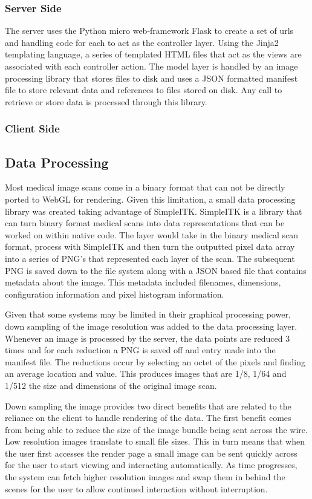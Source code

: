 \documentclass{acm_proc_article-sp}
\begin{document}
\subsubsection{Server Side}
	The server uses the Python micro web-framework Flask to create a set of urls and handling code for each to act as the controller layer.  Using the Jinja2 templating language, a series of templated HTML files that act as the views are associated with each controller action.  The model layer is handled by an image processing library that stores files to disk and uses a JSON formatted manifest file to store relevant data and references to files stored on disk.  Any call to retrieve or store data is processed through this library.

\subsubsection{Client Side}

\subsection{Data Processing}
Most medical image scans come in a binary format that can not be directly ported to WebGL for rendering.  Given this limitation, a small data processing library was created taking advantage of SimpleITK.  SimpleITK is a library that can turn binary format medical scans into data representations that can be worked on within native code.  The layer would take in the binary medical scan format, process with SimpleITK and then turn the outputted pixel data array into a series of PNG's that represented each layer of the scan.  The subsequent PNG is saved down to the file system along with a JSON based file that contains metadata about the image.  This metadata included filenames, dimensions, configuration information and pixel histogram information.

Given that some systems may be limited in their graphical processing power, down sampling of the image resolution was added to the data processing layer.  Whenever an image is processed by the server, the data points are reduced 3 times and for each reduction a PNG is saved off and entry made into the manifest file.  The reductions occur by selecting an octet of the pixels and finding an average location and value.  This produces images that are 1/8, 1/64 and 1/512 the size and dimensions of the original image scan.

Down sampling the image provides two direct benefits that are related to the reliance on the client to handle rendering of the data.  The first benefit comes from being able to reduce the size of the image bundle being sent across the wire.  Low resolution images translate to small file sizes.  This in turn means that when the user first accesses the render page a small image can be sent quickly across for the user to start viewing and interacting automatically.  As time progresses, the system can fetch higher resolution images and swap them in behind the scenes for the user to allow continued interaction without interruption.  
\end{document}
